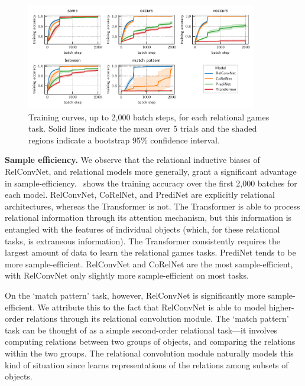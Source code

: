 \begin{figure}
    \centering
    \includegraphics[width=0.9\textwidth]{figs/experiments/all_training_curves.pdf}
    \caption{Training curves, up to 2,000 batch steps, for each relational games task. Solid lines indicate the mean over 5 trials and the shaded regions indicate a bootstrap 95\% confidence interval.}\label{fig:training_curves}
\end{figure}

\textbf{Sample efficiency.} We observe that the relational inductive biases of RelConvNet, and relational models more generally, grant a significant advantage in sample-efficiency.~ shows the training accuracy over the first 2,000 batches for each model. RelConvNet, CoRelNet, and PrediNet are explicitly relational architectures, whereas the Transformer is not. The Transformer is able to process relational information through its attention mechanism, but this information is entangled with the features of individual objects (which, for these relational tasks, is extraneous information). The Transformer consistently requires the largest amount of data to learn the relational games tasks. PrediNet tends to be more sample-efficient. RelConvNet and CoRelNet are the most sample-efficient, with RelConvNet only slightly more sample-efficient on most tasks.

On the `match pattern' task, however, RelConvNet is significantly more sample-efficient. We attribute this to the fact that RelConvNet is able to model higher-order relations through its relational convolution module. The `match pattern' task can be thought of as a simple second-order relational task---it involves computing relations between two groups of objects, and comparing the relations within the two groups. The relational convolution module naturally models this kind of situation since learns representations of the relations among subsets of objects. %

